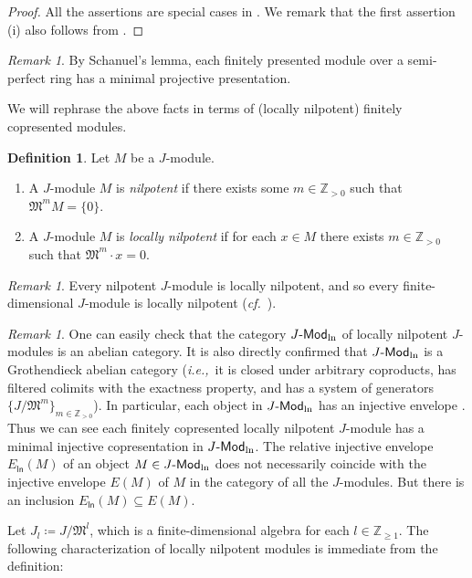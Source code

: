 \documentclass[12pt]{amsart}
\theoremstyle{definition}
\newtheorem{definition}[theorem]{Definition}
\theoremstyle{remark}
\newtheorem{remark}[theorem]{Remark}
\numberwithin{equation}{section}
\newcommand{\ie}{\textit{i.e.,}\ }
\newcommand{\confer}{\textit{cf.}\ }
\newcommand{\fM}{\mathfrak{M}}
\newcommand{\Modln}{\mathchar`-\mathsf{Mod}_{\mathrm{ln}}}
\begin{document}
\begin{proof}
        All the assertions are special cases in \cite[Corollary~4.6~(ii), Lemma~4.10]{KM22}. We remark that the first assertion (i) also follows from \cite[Lemma~2.17]{Keller-Yang_2011}.
     \end{proof}
\begin{remark}
    By Schanuel's lemma, each finitely presented module over a semi-perfect ring has a minimal projective presentation.
\end{remark}
We will rephrase the above facts in terms of (locally nilpotent) finitely copresented modules.
   
\begin{definition} \label{def:l-nil}
Let $M$ be a $J$-module.
    \begin{enumerate}
        \item[(i)] A $J$-module $M$ is \emph{nilpotent} if  there exists some $m\in \mathbb{Z}_{>0}$ such that $\fM^m M=\{0\}$.
        \item[(ii)] A $J$-module $M$ is \emph{locally nilpotent} if  for each $x\in M$ there exists $m\in \mathbb{Z}_{> 0}$ such that $\fM^m\cdot x = 0$.
    \end{enumerate}
\end{definition}
\begin{remark}
    Every nilpotent $J$-module is locally nilpotent, and so every finite-dimensional $J$-module is locally nilpotent (\confer \cite[\S 10]{DWZ08}).
\end{remark}
\begin{remark}\label{rem:Gro}
    One can easily check that the category $J\Modln$ of locally nilpotent $J$-modules is an abelian category. It is also directly confirmed that $J\Modln$ is a Grothendieck abelian category (\ie it is closed under arbitrary coproducts, has filtered  colimits with the exactness property, and has a system of generators $\{J/\fM^m\}_{m\in \mathbb{Z}_{>0}}$). In particular, each object in $J\Modln$ has an injective envelope \cite{Gab62}. Thus we can see each finitely copresented locally nilpotent $J$-module has a minimal injective copresentation in $J\Modln$.
    The relative injective envelope $E_{\mathsf{ln}}(M)$ of an object $M\in J\Modln$ does not necessarily coincide with the injective envelope $E(M)$ of $M$ in the category of all the $J$-modules. But there is an inclusion $E_{\mathsf{ln}}(M) \subseteq E(M)$.
\end{remark}
 Let $J_l\coloneqq J/\fM^l$, which is a finite-dimensional algebra  for each $l\in \mathbb{Z}_{\geq 1}$. The following characterization of locally nilpotent modules is immediate from the definition:
\end{document}
